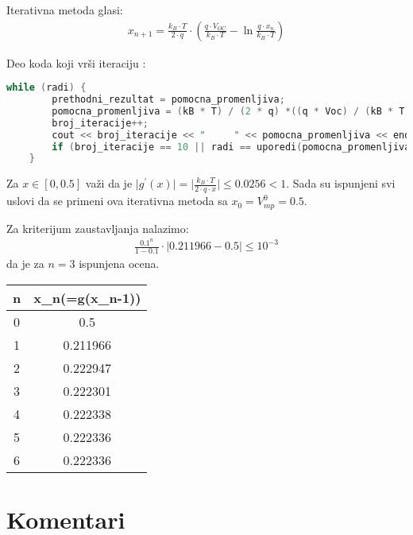 \documentclass[12pt,leqno,a4paper]{article}
\begin{document}
Iterativna metoda glasi:
\begin{equation*}
  \begin{aligned}
   x_{n+1}=\frac{k_{B} \cdot T}{2 \cdot q} \cdot (\frac{q \cdot V_{OC}}{k_{B} \cdot T} - \ln{\frac{q \cdot x_{n}}{k_{B} \cdot T}})
 \end{aligned}
\end{equation*}

Deo koda koji vr\v si iteraciju :
\begin{lstlisting}[language=C++ ]
while (radi) {
		prethodni_rezultat = pomocna_promenljiva;
		pomocna_promenljiva = (kB * T) / (2 * q) *((q * Voc) / (kB * T) - log((q * pomocna_promenljiva) / (kB * T)));
		broj_iteracije++;
		cout << broj_iteracije << "		" << pomocna_promenljiva << endl;
		if (broj_iteracije == 10 || radi == uporedi(pomocna_promenljiva, prethodni_rezultat)) { break; }
	}
\end{lstlisting}

Za $x \in [0,0.5]$ va\v zi da je $\mid g^{\prime}(x) \mid = \mid \frac{k_{B} \cdot T}{2 \cdot q \cdot x}\mid \leq 0.0256 < 1$. Sada su ispunjeni svi uslovi da se primeni ova iterativna metoda sa $x_{0}=V_{mp}^{0}=0.5$.

Za kriterijum zaustavljanja nalazimo:
\begin{equation*}
  \begin{aligned}
  \frac{0.1^{n}}{1-0.1} \cdot \mid 0.211966 - 0.5 \mid \leq 10^{-3}
 \end{aligned}
\end{equation*}
da je za $n=3$ ispunjena ocena.

\begin{table}[h!]
\centering
 \begin{tabular}{||c c||} 
 \hline
 n & x_{n}(=g(x_{n-1})) \\ [0.5ex] 
 \hline\hline
 0 & 0.5 \\ 
 1 & 0.211966\\ 
 2 & 0.222947\\ 
 3 & 0.222301\\ 
 4 & 0.222338\\ 
 5 & 0.222336\\ 
 6 & 0.222336\\ 
 \hline
 \end{tabular}
\end{table}


\section{Komentari}
\end{document}
